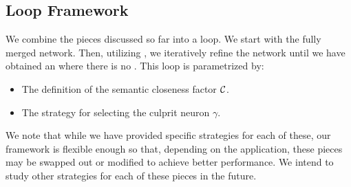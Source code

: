 \subsection{\cegar Loop Framework}
\label{s:abs-ref-fw}

We combine the pieces discussed so far into a \cegar loop.  
We start with the fully merged network. Then, utilizing \gencex, we iteratively
refine the network until we have obtained an \abs where there is no \gencex.
This loop is parametrized by:

\begin{itemize}
    \item The definition of the semantic closeness factor $\mathcal{C}$.
    \item The strategy for selecting the culprit neuron $\gamma$.
\end{itemize}

We note that while we have provided specific strategies for each of these, our
framework is flexible enough so that, depending on the application, these pieces
may be swapped out or modified to achieve better performance. We intend to study
other strategies for each of these pieces in the future.

